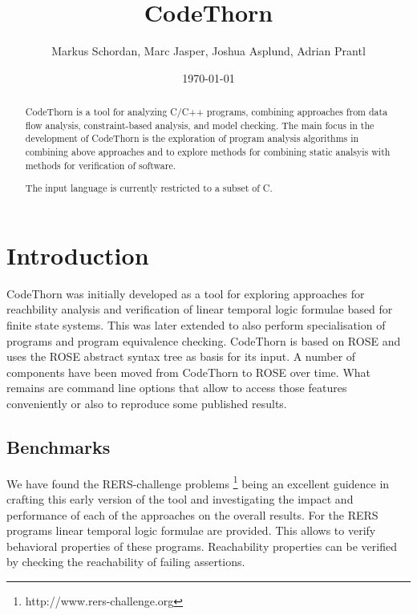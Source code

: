 \documentclass[natbib]{article}
\begin{document}
\title{CodeThorn}

\author{\small Markus Schordan, Marc Jasper, Joshua Asplund, Adrian Prantl}
\date{\today}

\maketitle

\begin{abstract}

CodeThorn is a tool for analyzing C/C++ programs, combining approaches
from data flow analysis, constraint-based analysis, and model
checking. The main focus in the development of CodeThorn is the
exploration of program analysis algorithms in combining above
approaches and to explore methods for combining static analsyis with
methods for verification of software.

The input language is currently restricted to a subset of C.

\end{abstract}


\section{Introduction}
\label{sec:intro}

CodeThorn was initially developed as a tool for exploring approaches
for reachbility analysis and verification of linear temporal logic
formulae based for finite state systems. This was later extended to
also perform specialisation of programs and program equivalence
checking. CodeThorn is based on ROSE \cite{roseWWW} and uses the ROSE abstract syntax
tree as basis for its input. A number of components have been moved
from CodeThorn to ROSE over time. What remains are command line
options that allow to access those features conveniently or also to
reproduce some published results.

\subsection{Benchmarks}

We have found the RERS-challenge
problems \footnote{http://www.rers-challenge.org} being an excellent
guidence in crafting this early version of the tool and investigating
the impact and performance of each of the approaches on the overall
results. For the RERS programs linear temporal logic formulae are
provided. This allows to verify behavioral properties of these
programs. Reachability properties can be verified by checking the
reachability of failing assertions.
\end{document}
